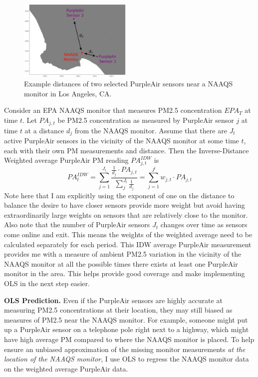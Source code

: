\documentclass[12pt]{article}
\begin{document}
\begin{figure}
  \begin{center}
    \includegraphics[width=0.48\textwidth]{IDW_diagram}
  \end{center}
  \caption{Example distances of two selected PurpleAir sensors near a NAAQS monitor in Los Angeles, CA.}
  \label{fig:idw_diagram}
\end{figure}

Consider an EPA NAAQS monitor that measures PM2.5 concentration $EPA_T$ at time $t$. Let $PA_{j,t}$ be PM2.5 concentration as measured by PurpleAir sensor $j$ at time $t$ at a distance $d_j$ from the NAAQS monitor. Assume that there are $J_t$ active PurpleAir sensors in the vicinity of the NAAQS monitor at some time $t$, each with their own PM measurements and distance. Then the Inverse-Distance Weighted average PurpleAir PM reading $PA^{IDW}_{j,t}$ is
\begin{equation}
    PA^{IDW}_t= \sum\limits_{j=1}^{J_t} \dfrac{\frac{1}{d_j}\cdot PA_{j,t}}{\sum\limits_j^{J_t}\frac{1}{d_j}}
    = \sum\limits_{j=1}^{J^t} w_{j,t}\cdot PA_{j,t}
\end{equation}
Note here that I am explicitly using the exponent of one on the distance to balance the desire to have closer sensors provide more weight but avoid having extraordinarily large weights on sensors that are relatively close to the monitor. Also note that the number of PurpleAir sensors $J_t$ changes over time as sensors come online and exit. This means the weights of the weighted average need to be calculated separately for each period. This IDW average PurpleAir measurement provides me with a measure of ambient PM2.5 variation in the vicinity of the NAAQS monitor at all the possible times there exists at least one PurpleAir monitor in the area. This helps provide good coverage and make implementing OLS in the next step easier. 

\textbf{OLS Prediction.} Even if the PurpleAir sensors are highly accurate at measuring PM2.5 concentrations at their location, they may still biased as measures of PM2.5 near the NAAQS monitor. For example, someone might put up a PurpleAir sensor on a telephone pole right next to a highway, which might have high average PM compared to where the NAAQS monitor is placed. To help ensure an unbiased approximation of the missing monitor measurements \textit{at the location of the NAAQS monitor}, I use OLS to regress the NAAQS monitor data on the weighted average PurpleAir data.
\end{document}
